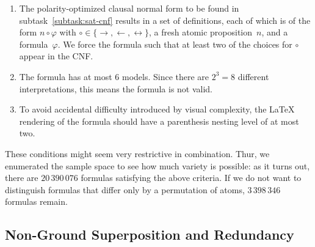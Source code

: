 \begin{enumerate}
    \item
        The polarity-optimized clausal normal form
        to be found in subtask~\ref{subtask:sat-cnf} results in a set of definitions,
        each of which is of the form
        $n \circ \varphi$ with $\circ \in \{ \rightarrow, \leftarrow, \leftrightarrow \}$,
        a fresh atomic proposition~$n$, and a formula~$\varphi$.
        We force the formula such that at least two of the choices for $\circ$ appear in the CNF.
    \item
        The formula has at most $6$ models.
        Since there are $2^3 = 8$ different interpretations,
        this means the formula is not valid.
    \item
        To avoid accidental difficulty introduced by visual complexity,
        the \LaTeX{} rendering of the formula should have a parenthesis nesting level of at most two.
\end{enumerate}

These conditions might seem very restrictive in combination.
Thur, we enumerated the sample space to see how much variety is possible:
as it turns out, there are $20\,390\,076$ formulas satisfying the above criteria.
If we do not want to distinguish formulas that differ only by a permutation of atoms,
$3\,398\,346$ formulas remain.





\subsection{Non-Ground Superposition and Redundancy}\label{sec:fo}

